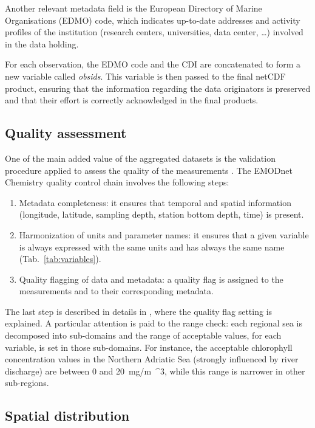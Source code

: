 \documentclass[essd,manuscript]{copernicus}
\begin{document}
Another relevant metadata field is the European Directory of Marine Organisations (EDMO) code, which indicates up-to-date addresses and activity profiles of the institution (research centers, universities, data center, \ldots) involved in the data holding. 

For each observation, the EDMO code and the CDI are concatenated to form a new variable called \textit{obsids}. This variable is then passed to the final netCDF product, ensuring that the information regarding the data originators is preserved and that their effort is correctly acknowledged in the final products. 

\subsection{Quality assessment\label{sec:dataqualitycontrol}}

One of the main added value of the aggregated datasets is the validation procedure applied to assess the quality of the measurements \citep{Barth2015,Lipizer2021,Lipizer2023}. The EMODnet Chemistry quality control chain involves the following steps:
\begin{enumerate}
\item Metadata completeness: it ensures that temporal and spatial information (longitude, latitude, sampling depth, station bottom depth, time) is present.
\item Harmonization of units and parameter names: it ensures that a given variable is always expressed with the same units and has always the same name (Tab.~\ref{tab:variables}). 
\item Quality flagging of data and metadata: a quality flag is assigned to the measurements and to their corresponding metadata.
\end{enumerate} 
The last step is described in details in \citet{Lipizer2023}, where the quality flag setting is explained. A particular attention is paid to the range check: each regional sea is decomposed into sub-domains and the range of acceptable values, for each variable, is set in those sub-domains. For instance, the acceptable chlorophyll concentration values in the Northern Adriatic Sea (strongly influenced by river discharge) are between 0 and 20~\unit{mg/m{^3}}, while this range is narrower in other sub-regions.

\subsection{Spatial distribution}
\end{document}
